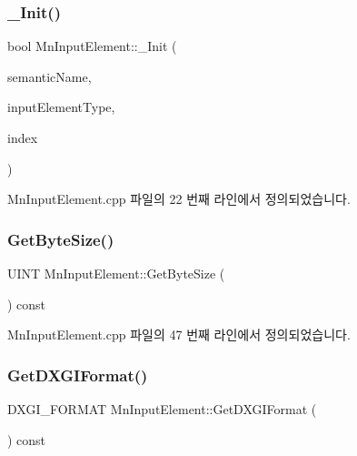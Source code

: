 \subsubsection{\texorpdfstring{\+\_\+\+Init()}{\_Init()}}
{\footnotesize\ttfamily bool Mn\+Input\+Element\+::\+\_\+\+Init (\begin{DoxyParamCaption}\item[{std\+::string}]{semantic\+Name,  }\item[{const \hyperlink{namespace_m_n_l_a8605571a36b2bb477280767d71fe6f9e}{Mn\+Input\+Element\+Type} \&}]{input\+Element\+Type,  }\item[{U\+I\+NT}]{index }\end{DoxyParamCaption})\hspace{0.3cm}{\ttfamily [private]}}



Mn\+Input\+Element.\+cpp 파일의 22 번째 라인에서 정의되었습니다.

\mbox{\label{class_m_n_l_1_1_mn_input_element_a1bdc917e5920941e913048e6a39eaa48}} 
\subsubsection{\texorpdfstring{Get\+Byte\+Size()}{GetByteSize()}}
{\footnotesize\ttfamily U\+I\+NT Mn\+Input\+Element\+::\+Get\+Byte\+Size (\begin{DoxyParamCaption}{ }\end{DoxyParamCaption}) const}



Mn\+Input\+Element.\+cpp 파일의 47 번째 라인에서 정의되었습니다.

\mbox{\label{class_m_n_l_1_1_mn_input_element_ac9856490638cc98b23e533782107e4a6}} 
\subsubsection{\texorpdfstring{Get\+D\+X\+G\+I\+Format()}{GetDXGIFormat()}}
{\footnotesize\ttfamily D\+X\+G\+I\+\_\+\+F\+O\+R\+M\+AT Mn\+Input\+Element\+::\+Get\+D\+X\+G\+I\+Format (\begin{DoxyParamCaption}{ }\end{DoxyParamCaption}) const}



